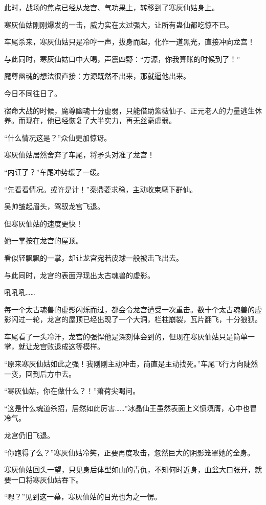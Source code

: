 \begin{this_body}
此时，战场的焦点已经从龙宫、气功果上，转移到了寒灰仙姑身上。

寒灰仙姑刚刚爆发的一击，威力实在太过强大，让所有蛊仙都吃惊不已。

车尾杀来，寒灰仙姑只是冷哼一声，拔身而起，化作一道黑光，直接冲向龙宫！

与此同时，寒灰仙姑口中大喝，声震四野：“方源，你我算账的时候到了！”

魔尊幽魂的想法很直接：方源既然不出来，那就逼他出来。

今日不同往日了。

宿命大战的时候，魔尊幽魂十分虚弱，只能借助紫薇仙子、正元老人的力量逃生休养。而现在，他已经恢复了大半实力，再无丝毫虚弱。

“什么情况这是？”众仙更加惊讶。

寒灰仙姑居然舍弃了车尾，将矛头对准了龙宫！

“内讧了？”车尾冲势缓了一缓。

“先看看情况。或许是计！”秦鼎菱求稳，主动收束麾下群仙。

吴帅皱起眉头，驾驭龙宫飞退。

但寒灰仙姑的速度更快！

她一掌按在龙宫的屋顶。

看似轻飘飘的一掌，却让龙宫宛若皮球一般被击飞出去。

与此同时，龙宫的表面浮现出太古魂兽的虚影。

吼吼吼……

每一个太古魂兽的虚影闪烁而过，都会令龙宫遭受一次重击。数十个太古魂兽的虚影闪过一轮，龙宫的屋顶已经出现了一个大洞，栏柱崩裂，瓦片翻飞，十分狼狈。

车尾看了一头冷汗，龙宫的强悍他是深刻体会到的，但现在寒灰仙姑只是简单一掌，就让龙宫败退成这等模样。

“原来寒灰仙姑如此之强！我刚刚主动冲击，简直是主动找死。”车尾飞行方向陡然一变，回到后方中去。

“寒灰仙姑，你在做什么？！”萧荷尖喝问。

“这是什么魂道杀招，居然如此厉害……”冰晶仙王虽然表面上义愤填膺，心中也冒冷气。

龙宫仍旧飞退。

“你跑得了么？”寒灰仙姑冷笑，正要再度攻击，忽然巨大的阴影笼罩她的全身。

寒灰仙姑回头一望，只见身后体型如山的青仇，不知何时近身，血盆大口张开，就要一口将寒灰仙姑吞下。

“嗯？”见到这一幕，寒灰仙姑的目光也为之一愣。


\end{this_body}
